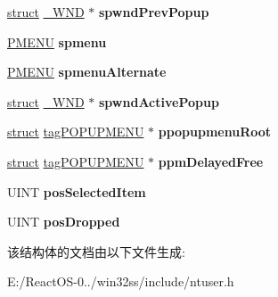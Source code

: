 \begin{DoxyCompactItemize}
\hyperlink{interfacestruct}{struct} \hyperlink{struct___w_n_d}{\+\_\+\+W\+ND} $\ast$ {\bfseries spwnd\+Prev\+Popup}
\item 
\mbox{\label{structtag_p_o_p_u_p_m_e_n_u_a3295b4b11bb560b441c42f516d064d2a}} 
\hyperlink{structtag_m_e_n_u}{P\+M\+E\+NU} {\bfseries spmenu}
\item 
\mbox{\label{structtag_p_o_p_u_p_m_e_n_u_a1dafadd971cf3a4efa8f0c125ef9a005}} 
\hyperlink{structtag_m_e_n_u}{P\+M\+E\+NU} {\bfseries spmenu\+Alternate}
\item 
\mbox{\label{structtag_p_o_p_u_p_m_e_n_u_ae6949ecab43e830fca61ed3026b31d3f}} 
\hyperlink{interfacestruct}{struct} \hyperlink{struct___w_n_d}{\+\_\+\+W\+ND} $\ast$ {\bfseries spwnd\+Active\+Popup}
\item 
\mbox{\label{structtag_p_o_p_u_p_m_e_n_u_a52f5d908f5e9fede0d533a4942f35ca3}} 
\hyperlink{interfacestruct}{struct} \hyperlink{structtag_p_o_p_u_p_m_e_n_u}{tag\+P\+O\+P\+U\+P\+M\+E\+NU} $\ast$ {\bfseries ppopupmenu\+Root}
\item 
\mbox{\label{structtag_p_o_p_u_p_m_e_n_u_a2360ef603cfe196b2499fdc37e85dc32}} 
\hyperlink{interfacestruct}{struct} \hyperlink{structtag_p_o_p_u_p_m_e_n_u}{tag\+P\+O\+P\+U\+P\+M\+E\+NU} $\ast$ {\bfseries ppm\+Delayed\+Free}
\item 
\mbox{\label{structtag_p_o_p_u_p_m_e_n_u_ad08cb135ddd52885b6a1c1198dc24b30}} 
U\+I\+NT {\bfseries pos\+Selected\+Item}
\item 
\mbox{\label{structtag_p_o_p_u_p_m_e_n_u_ac9b164c2eb7a85628c7c6a66150d2485}} 
U\+I\+NT {\bfseries pos\+Dropped}
\end{DoxyCompactItemize}


该结构体的文档由以下文件生成\+:\begin{DoxyCompactItemize}
\item 
E\+:/\+React\+O\+S-\/0../win32ss/include/ntuser.\+h\end{DoxyCompactItemize}
